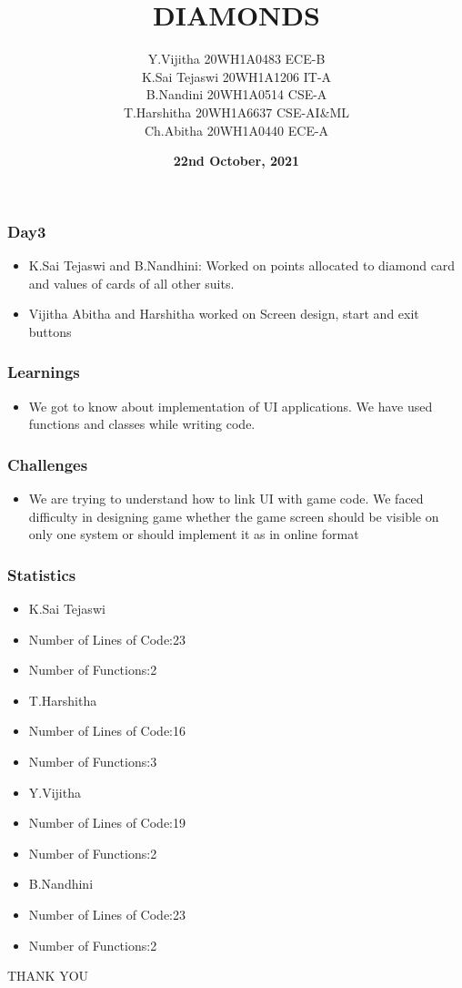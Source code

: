 \documentclass[12pt]{beamer}
\title{\textbf{DIAMONDS}}
\author[Bvrith]{Y.Vijitha 20WH1A0483 ECE-B\\K.Sai Tejaswi 20WH1A1206 IT-A\\ B.Nandini 20WH1A0514 CSE-A\\ T.Harshitha 20WH1A6637 CSE-AI&ML\\ Ch.Abitha 20WH1A0440 ECE-A}
\date{\textbf{22nd October, 2021}}
\begin{document}
    \begin{frame}
        \titlepage
    \end{frame}
	    \begin{frame}
	\frametitle{Day3}
	\begin{itemize}
	    \item K.Sai Tejaswi and B.Nandhini: Worked on points allocated to diamond card and values of cards of all other suits.
	    \item Vijitha Abitha and Harshitha worked on Screen design, start and exit buttons 
	    \end{itemize}
	    \end{frame}
    \begin{frame}
        \frametitle{Learnings}
	\begin{itemize}
	    \item We got to know about implementation of UI applications. We have used functions and classes while writing code. 
	\end{itemize}
    \end{frame}
    \begin{frame}
	\frametitle{Challenges}
        \begin{itemize}
	    \item We are trying to understand how to link UI with game code. We faced difficulty in designing game whether the game screen should be visible on only one system or should implement it as in online format
        \end{itemize}
    \end{frame}
    \begin{frame}
	\frametitle{Statistics}
        \begin{itemize}
        \item K.Sai Tejaswi\\
	     \item Number of Lines of Code:23\\
	     \item Number of Functions:2\\
	     \item T.Harshitha\\
	     \item Number of Lines of Code:16\\
	     \item Number of Functions:3\\
	     \item Y.Vijitha\\
	     \item Number of Lines of Code:19\\
	     \item Number of Functions:2\\
	     \item B.Nandhini\\
	     \item Number of Lines of Code:23\\
	     \item Number of Functions:2\\
	     
        \end{itemize}
    \end{frame}
    \begin{frame}
	\begin{center}
	      THANK YOU
	\end{center}
    \end{frame}
\end{document}

